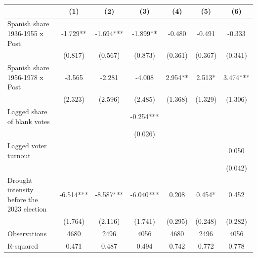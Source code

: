 \begin{table}
\centering
\begin{tabular}[t]{lcccccc}
\toprule
  & (1) & (2) & (3) & (4) & (5) & (6)\\
\midrule
Spanish share 1936-1955 x Post & -1.729** & -1.694*** & -1.899** & -0.480 & -0.491 & -0.333\\
 & (0.817) & (0.567) & (0.873) & (0.361) & (0.367) & (0.341)\\
Spanish share 1956-1978 x Post & -3.565 & -2.281 & -4.008 & 2.954** & 2.513* & 3.474***\\
 & (2.323) & (2.596) & (2.485) & (1.368) & (1.329) & (1.306)\\
Lagged share of blank votes &  &  & -0.254*** &  &  & \\
 &  &  & (0.026) &  &  & \\
Lagged voter turnout &  &  &  &  &  & 0.050\\
 &  &  &  &  &  & (0.042)\\
Drought intensity before the 2023 election & -6.514*** & -8.587*** & -6.040*** & 0.208 & 0.454* & 0.452\\
 & (1.764) & (2.116) & (1.741) & (0.295) & (0.248) & (0.282)\\
\midrule
Observations & 4680 & 2496 & 4056 & 4680 & 2496 & 4056\\
R-squared & 0.471 & 0.487 & 0.494 & 0.742 & 0.772 & 0.778\\
\bottomrule
\end{tabular}
\end{table}
